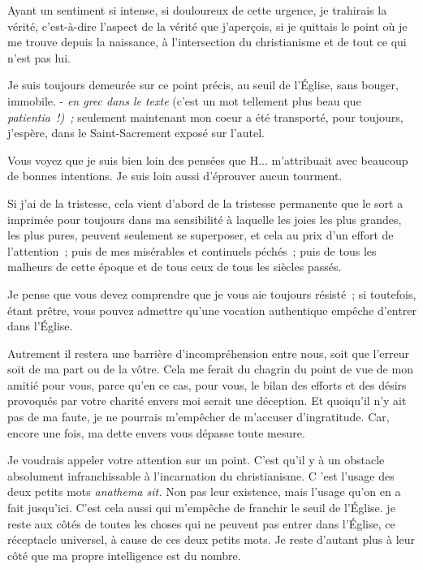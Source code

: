 \documentclass[french,twoside]{book} %
\begin{document}
Ayant un sentiment si intense, si douloureux de cette urgence, je trahirais la vérité, c'est-à-dire l'aspect de la vérité que j'aperçois, si je quittais le point où je me trouve depuis la naissance, à l'intersection du christianisme et de tout ce qui n'est pas lui.\par
Je suis toujours demeurée sur ce point précis, au seuil de l'Église, sans bouger, immobile. - {\itshape en grec dans le texte} (c'est un mot tellement plus beau que {\itshape patientia !) ;} seulement maintenant mon coeur a été transporté, pour toujours, j'espère, dans le Saint-Sacrement exposé sur l'autel.\par
Vous voyez que je suis bien loin des pensées que H... m'attribuait avec beaucoup de bonnes intentions. Je suis loin aussi d'éprouver aucun tourment.\par
Si j'ai de la tristesse, cela vient d'abord de la tristesse permanente que le sort a imprimée pour toujours dans ma sensibilité à laquelle les joies les plus grandes, les plus pures, peuvent seulement se superposer, et cela au prix d'un effort de l'attention ; puis de mes misérables et continuels péchés ; puis de tous les malheurs de cette époque et de tous ceux de tous les siècles passés.\par
Je pense que vous devez comprendre que je vous aie toujours résisté ; si toutefois, étant prêtre, vous pouvez admettre qu'une vocation authentique empêche d'entrer dans l'Église.\par
Autrement il restera une barrière d'incompréhension entre nous, soit que l'erreur soit de ma part ou de la vôtre. Cela me ferait du chagrin du point de vue de mon amitié pour vous, parce qu'en ce cas, pour vous, le bilan des efforts et des désirs provoqués par votre charité envers moi serait une déception. Et quoiqu'il n'y ait pas de ma faute, je ne pourrais m'empêcher de m'accuser d'ingratitude. Car, encore une fois, ma dette envers vous dépasse toute mesure.\par
Je voudrais appeler votre attention sur un point. C'est qu'il y à un obstacle absolument infranchissable à l'incarnation du christianisme. C 'est l'usage des deux petits mots {\itshape anathema sit.} Non pas leur existence, mais l'usage qu'on en a fait jusqu'ici. C'est cela aussi qui m'empêche de franchir le seuil de l'Église. je reste aux côtés de toutes les choses qui ne peuvent pas entrer dans l'Église, ce réceptacle universel, à cause de ces deux petits mots. Je reste d'autant plus à leur côté que ma propre intelligence est du nombre.\par
\end{document}
